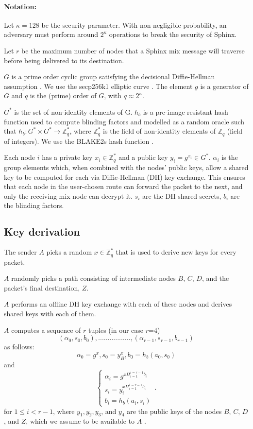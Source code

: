 \paragraph{Notation:}Let $\kappa=128$ be the security parameter. With non-negligible probability, an adversary must perform around $2^\kappa$ operations to break the security of Sphinx.

Let $r$ be the maximum number of nodes that a Sphinx mix message will traverse before being delivered to its destination.

$G$ is a prime order cyclic group satisfying the decisional Diffie-Hellman assumption \cite{Boneh_1998}. We use the secp256k1 elliptic curve \cite{sec2}. The element $g$ is a generator of $G$ and $q$ is the (prime) order of $G$, with $q\approx2^{\kappa}$.

$G^*$ is the set of non-identity elements of G. $h_b$ is a pre-image resistant hash function used to compute blinding factors and modelled as a random oracle such that
$h_b:G^*\times G^*\rightarrow\mathbb{Z}^*_q$, where $\mathbb{Z}^*_q$ is the field of non-identity elements of $\mathbb{Z}_q$ (field of integers). We use the BLAKE2s hash function \cite{blake2}.

Each node $i$ has a private key $x_{i}\in \mathbb{Z}^*_q$ and a public key $y_{i}=g^{x_{i}}\in G^*$.
$\alpha_i$ is the group elements which, when combined with the nodes’ public keys, allow a shared key to be computed for each via Diffie-Hellman (DH) key exchange. This ensures that each node in the user-chosen route can forward the packet to the next, and only the receiving mix node can decrypt it.
$s_i$ are the DH shared secrets, $b_i$ are the blinding factors.

\subsection{Key derivation}
The sender $A$ picks a random $x\in \mathbb{Z}^*_q$ that is used to derive new keys for every packet.

$A$ randomly picks a path consisting of intermediate nodes $B$, $C$, $D$, and the packet's final destination, $Z$.

$A$ performs an offline DH key exchange with each of these nodes and derives shared keys with each of them.

$A$ computes a sequence of $r$ tuples (in our case $r$=4)  $$(\alpha_0,s_0,b_0),.................,(\alpha_{r-1},s_{r-1},b_{r-1})$$ as follows:
$$\alpha_0=g^x,s_0=y^x_B,b_0=h_b(a_0,s_0)$$
and
\begin{equation}
    \begin{cases}
        \alpha_i=g^{x\Pi_{i=1}^{i=r-1}b_i}\\
        s_i=y^{x\Pi_{i=1}^{i=r-1}b_i}_i \\
        b_i=h_b(a_i,s_i)
    \end{cases}\,.
    \label{eq:1}
\end{equation}
for $1\le i < r-1$, where $y_1, y_2, y_3$, and $y_4$ are the public keys of the nodes $B$, $C$, $D$, and $Z$, which we assume to be available to $A$ .

